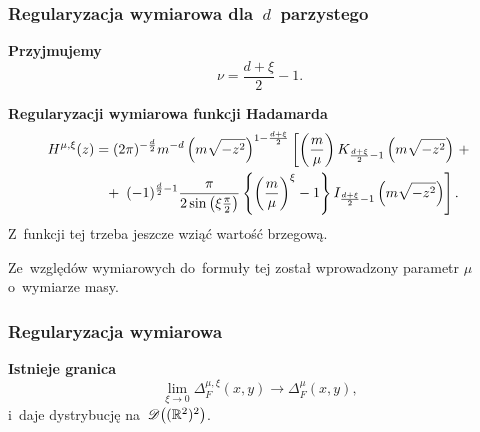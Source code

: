 \documentclass[10pt,t]{beamer}
\begin{document}
\begin{frame}
  \frametitle{Regularyzacja wymiarowa dla~$d$~parzystego}


  \textbf{Przyjmujemy} \\
  \begin{equation}
    \label{eq:Epstein-Glaser-16}
    \nu = \frac{ d + \xi }{ 2 } - 1.
  \end{equation}

  \vspace{\spaceThree}



  \textbf{Regularyzacji wymiarowa funkcji Hadamarda}
  \begin{equation}
    \label{eq:Epstein-Glaser-17}
    \begin{split}
      H^{ \mu, \xi }( z )
      &= ( 2 \pi )^{ -\frac{ d }{ 2 } } m^{ -d }
        \left( m \sqrt{ -z^{ 2 } } \right)^{ 1 - \frac{ d + \xi }{ 2 } }
        \left[ \left( \frac{ m }{ \mu } \right) K_{ \frac{ d + \xi }{ 2 }
        - 1 }\left( m \sqrt{ -z^{ 2 } } \right) \, + \right. \\
      &\hphantom{=} + \, \left. ( -1 )^{ \frac{ d }{ 2 } - 1 } \frac{ \pi }{ 2
          \sin\left( \xi \frac{ \pi }{ 2 } \right) } \left\{ \left(
            \frac{ m }{ \mu } \right)^{ \xi } - 1 \right\} I_{ \frac{
            d + \xi }{ 2 } - 1 }\left( m\sqrt{ -z^{ 2 } } \right) \right].
    \end{split}
  \end{equation}
  Z~funkcji tej trzeba jeszcze wziąć wartość brzegową.

  Ze~względów wymiarowych do~formuły tej został wprowadzony parametr
  $\mu$ o~wymiarze masy.

\end{frame}





\begin{frame}
  \frametitle{Regularyzacja wymiarowa}


  \textbf{Istnieje granica}
  \begin{equation}
    \label{eq:Epstein-Glaser-18}
    \lim\limits_{ \xi \to 0 } \Delta_{ F }^{ \mu, \xi }( x, y ) \to
    \Delta_{ F }^{ \mu }( x, y ),
  \end{equation}
  i~daje dystrybucję na~$\mathcal{D}\big( ( \mathbb{R}^{ 2 } )^{ 2 } \big)$.

\end{frame}
\end{document}
